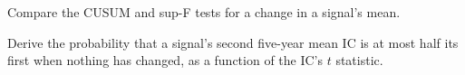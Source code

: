 \begin{interviewq}\label{iq:rs:half-life-decay-and-stability:5}
Compare the CUSUM and sup-F tests for a change in a signal's mean.
\end{interviewq}

\begin{interviewq}\label{iq:rs:half-life-decay-and-stability:6}
Derive the probability that a signal's second five-year mean IC is at most half its first when nothing has changed, as a function of the IC's
$t$ statistic.
\end{interviewq}
